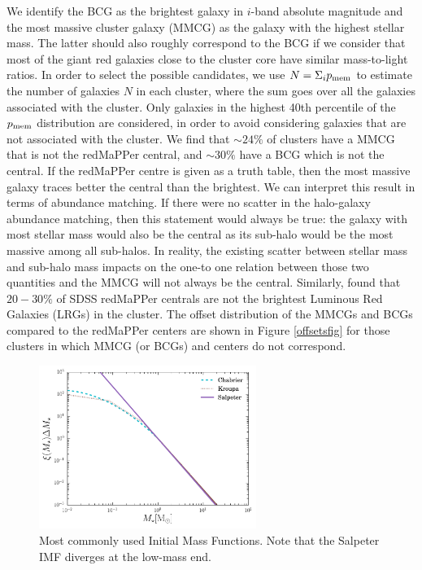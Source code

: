 {We  identify the BCG as the brightest galaxy in $i$-band absolute magnitude and the most massive cluster galaxy (MMCG) as the galaxy with the highest stellar mass. The latter should also roughly correspond to the  BCG if we consider that most of the giant red galaxies close to the cluster core  have similar mass-to-light ratios. In order to select the possible candidates, we use $N  = \Sigma_i p_{\rm mem}$ to estimate the number of galaxies $N$ in each cluster, where the sum goes over all the galaxies associated with the cluster.  Only galaxies in the highest 40th percentile of the $p_{\rm mem}$ distribution  are considered, in order to avoid considering galaxies that are not associated with the cluster.
We find that $\sim 24\%$ of clusters have a MMCG that is not the redMaPPer central, and $\sim 30\%$ have a BCG which is not the central. If the redMaPPer centre is given as a truth table, then the most massive galaxy traces better the central than the brightest. We can interpret this result in terms of abundance matching. If there were no scatter in the halo-galaxy abundance matching, then this statement would always be true: the galaxy with most stellar mass would also be the central as its sub-halo would be the most massive among all sub-halos. In reality, the existing scatter between stellar mass and sub-halo mass impacts on the one-to one relation between those two quantities and the MMCG will not always be the central. Similarly, \citet{hoshino} found that $20-30\%$ of SDSS redMaPPer centrals are not the brightest Luminous Red Galaxies (LRGs) in the cluster. The offset distribution of the MMCGs and BCGs compared to the redMaPPer centers are shown in Figure \ref{offsetsfig} for those clusters in which MMCG (or BCGs) and centers do not correspond. 


\begin{figure}\centering
\includegraphics[width=0.63\textwidth]{./chapters/chapter6/figs/Imfs.png}\caption{Most commonly used Initial Mass Functions. Note that the Salpeter IMF diverges at the low-mass end. }\label{fig:imf}
\end{figure}

}
